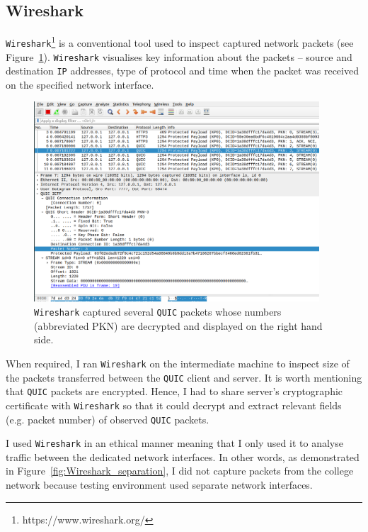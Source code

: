 \documentclass[12pt,a4paper,twoside,openright]{report}
\begin{document}
\subsection{Wireshark}

\texttt{Wireshark}\footnote{https://www.wireshark.org/} is a conventional tool used to inspect captured network packets (see Figure~\ref{fig:Wireshark_screenshot}).
\texttt{Wireshark} visualises key information about the packets -- source and destination \texttt{IP} addresses, type of protocol and time when the packet was received on the specified network interface.

    \begin{figure}[H]
    \centering
    \includegraphics[width=0.95\textwidth]{figs/Wireshark_screenshot.png}
    \caption{\texttt{Wireshark} captured several \texttt{QUIC} packets whose numbers (abbreviated PKN) are decrypted and displayed on the right hand side.}
    \label{fig:Wireshark_screenshot}
    \end{figure}
    
When required, I ran \texttt{Wireshark} on the intermediate machine to inspect size of the packets transferred between the \texttt{QUIC} client and server.
It is worth mentioning that \texttt{QUIC} packets are encrypted.
Hence, I had to share server's cryptographic certificate with \texttt{Wireshark} so that it could decrypt and extract relevant fields (e.g. packet number) of observed \texttt{QUIC} packets.

I used \texttt{Wireshark} in an ethical manner meaning that I only used it to analyse traffic between the dedicated network interfaces.
In other words, as demonstrated in Figure~\ref{fig:Wireshark_separation}, I did not capture packets from the college network because testing environment used separate network interfaces. 
\end{document}
